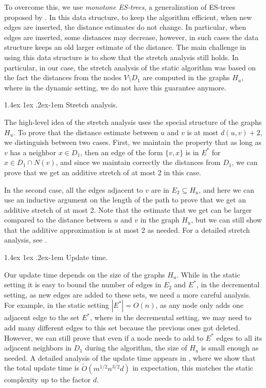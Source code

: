 \documentclass[11pt]{article}
\makeatletter
\theoremstyle{definition}
\theoremstyle{remark}
\renewcommand{\paragraph}{%
  \@startsection{paragraph}{4}%
  {\z@}{1.4ex \@plus 1ex \@minus .2ex}{-1em}%
  {\normalfont\normalsize\bfseries}%
}
\makeatother
\begin{document}
\begin{titlepage}
To overcome this, we use \emph{monotone ES-trees}, a generalization of ES-trees proposed by \cite{HKN2016,HKN14}. In this data structure, to keep the algorithm efficient, when new edges are inserted, the distance estimates do not change. In particular, when edges are inserted, some distances may decrease, however, in such cases the data structure keeps an old larger estimate of the distance. The main challenge in using this data structure is to show that the stretch analysis still holds. In particular, in our case, the stretch analysis of the static algorithm was based on the fact the distances from the nodes $V \setminus D_1$ are computed in the graphs $H_u$, where in the dynamic setting, we do not have this guarantee anymore.  

\paragraph{Stretch analysis.}

The high-level idea of the stretch analysis uses the special structure of the graphs $H_u$. To prove that the distance estimate between $u$ and $v$ is at most $d(u,v)+2$, we distinguish between two cases. First, we maintain the property that as long as $v$ has a neighbor $x \in D_1$, then an edge of the form $\{v,x\}$ is in $E^*$ for $x \in D_1 \cap N(v)$, and since we maintain correctly the distances from $D_1$, we can prove that we get an additive stretch of at most 2 in this case. 

In the second case, all the edges adjacent to $v$ are in $E_2 \subseteq H_u$, and here we can use an inductive argument on the length of the path to prove that we get an additive stretch of at most 2. Note that the estimate that we get can be larger compared to the distance between $u$ and $v$ in the graph $H_u$, but we can still show that the additive approximation is at most 2 as needed. For a detailed stretch analysis, see .

\paragraph{Update time.}

Our update time depends on the size of the graphs $H_u$. While in the static setting it is easy to bound the number of edges in $E_2$ and $E^*$, in the decremental setting, as new edges are added to these sets, we need a more careful analysis. For example, in the static setting $|E^*|=O(n)$, as any node only adds one adjacent edge to the set $E^*$, where in the decremental setting, we may need to add many different edges to this set because the previous ones got deleted. However, we can still prove that even if a node needs to add to $E^*$ edges to all its adjacent neighbors in $D_1$ during the algorithm, the size of $H_u$ is small enough as needed. A detailed analysis of the update time appears in , where we show that the total update time is $\tilde{O}(m^{1/2}n^{3/2}d)$ in expectation, this matches the static complexity up to the factor $d$.


\end{titlepage}
\end{document}
